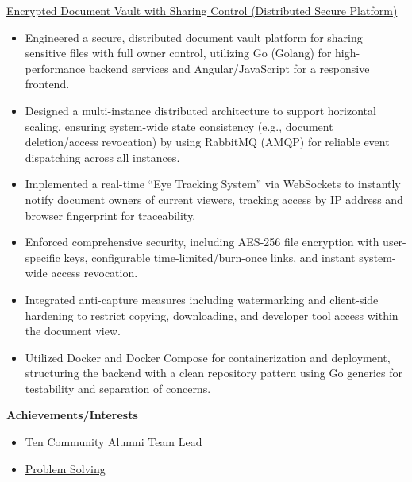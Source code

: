 \documentclass{res} %
\newcommand{\Section}[1]{%
  \vspace{8pt}%
  \begin{center}
    {\bfseries #1}
  \end{center}
  \vspace{2pt}%
}
\begin{document}
\begin{resume}
  \href{https://youtu.be/0133H3u1IlU}{{\large Encrypted Document Vault with Sharing Control (Distributed Secure Platform)}}
  \begin{itemize}\smallskip
    \item Engineered a secure, distributed document vault platform for sharing sensitive files with full owner control, utilizing Go (Golang) for high-performance backend services and Angular/JavaScript for a responsive frontend.
    \item Designed a multi-instance distributed architecture to support horizontal scaling, ensuring system-wide state consistency (e.g., document deletion/access revocation) by using RabbitMQ (AMQP) for reliable event dispatching across all instances.
    \item Implemented a real-time ``Eye Tracking System'' via WebSockets to instantly notify document owners of current viewers, tracking access by IP address and browser fingerprint for traceability.
    \item Enforced comprehensive security, including AES-256 file encryption with user-specific keys, configurable time-limited/burn-once links, and instant system-wide access revocation.
    \item Integrated anti-capture measures including watermarking and client-side hardening to restrict copying, downloading, and developer tool access within the document view.
    \item Utilized Docker and Docker Compose for containerization and deployment, structuring the backend with a clean repository pattern using Go generics for testability and separation of concerns.
  \end{itemize}

\Section{Achievements/Interests}
\begin{itemize}
    \item Ten Community Alumni Team Lead
    \item \href{https://github.com/sohail0992/js-algorithms.git}{Problem Solving}
\end{itemize}

\end{resume}
\end{document}
